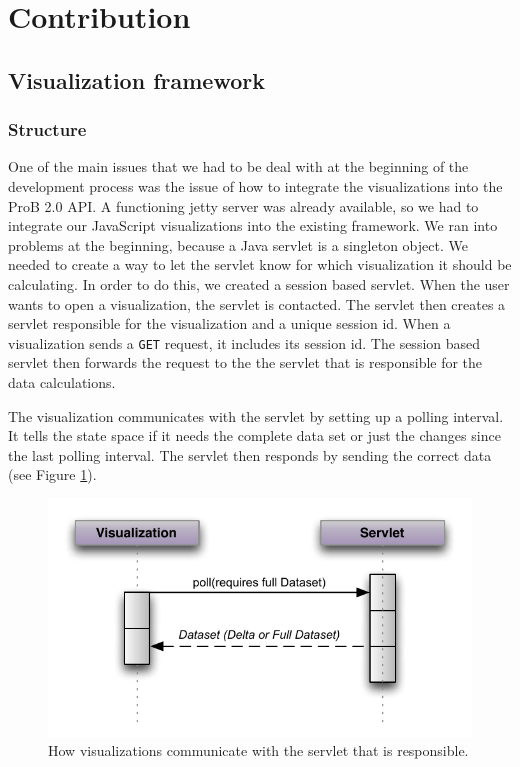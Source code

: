 \section{Contribution}

\subsection{Visualization framework}

\subsubsection{Structure}

One of the main issues that we had to be deal with at the beginning of the development process was the issue of how to integrate the visualizations into the ProB 2.0 API. A functioning jetty server was already available, so we had to integrate our JavaScript visualizations into the existing framework. We ran into problems at the beginning, because a Java servlet is a singleton object. We needed to create a way to let the servlet know for which visualization it should be calculating. In order to do this, we created a session based servlet. When the user wants to open a visualization, the servlet is contacted. The servlet then creates a servlet responsible for the visualization and a unique session id. When a visualization sends a \texttt{GET} request, it includes its session id. The session based servlet then forwards the request to the the servlet that is responsible for the data calculations.

The visualization communicates with the servlet by setting up a polling interval. It tells the state space if it needs the complete data set or just the changes since the last polling interval. The servlet then responds by sending the correct data (see Figure \ref{communication}).

\begin{center}
\begin{figure}[h!]
\includegraphics[width=14cm]{bilder/communication.pdf}
\caption{How visualizations communicate with the servlet that is responsible.}
\label{communication}
\end{figure}
\end{center}

